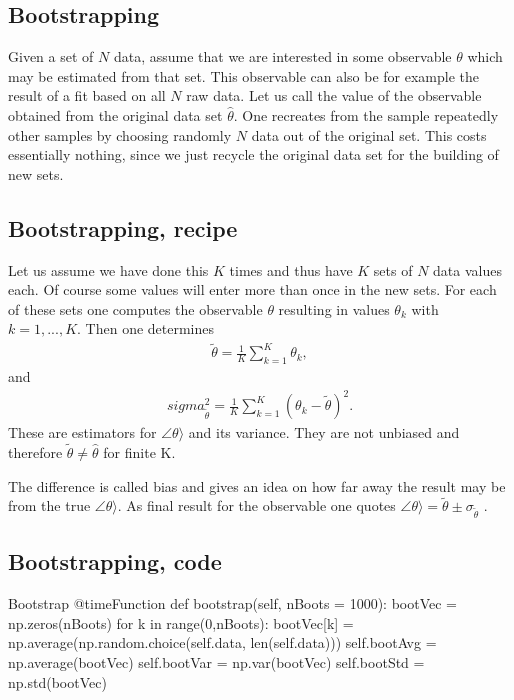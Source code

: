 \documentclass[letterpaper,10pt,english]{sphinxmanual}
\begin{document}
\subsection{Bootstrapping}
\label{\detokenize{chapter3:bootstrapping}}
Given a set of \(N\) data, assume that we are interested in some
observable \(\theta\) which may be estimated from that set. This observable can also be for example the result of a fit based on all \(N\) raw data.
Let us call the value of the observable obtained from the original
data set \(\hat{\theta}\). One recreates from the sample repeatedly
other samples by choosing randomly \(N\) data out of the original set.
This costs essentially nothing, since we just recycle the original data set for the building of new sets.




\subsection{Bootstrapping, recipe}
\label{\detokenize{chapter3:bootstrapping-recipe}}
Let us assume we have done this \(K\) times and thus have \(K\) sets of \(N\)
data values each.
Of course some values will enter more than once in the new sets. For each of these sets one computes the observable \(\theta\) resulting in values \(\theta_k\) with \(k = 1,...,K\). Then one determines
\begin{equation*}
\begin{split}
\tilde{\theta} = \frac{1}{K} \sum_{k=1}^K \theta_k,
\end{split}
\end{equation*}
and
\begin{equation*}
\begin{split}
sigma^2_{\tilde{\theta}} = \frac{1}{K} \sum_{k=1}^K \left(\theta_k-\tilde{\theta}\right)^2.
\end{split}
\end{equation*}
These are estimators for \(\angle\theta\rangle\) and its variance. They are not unbiased and therefore
\(\tilde{\theta}\neq\hat{\theta}\)  for finite K.

The difference is called bias and gives an idea on how far away the result may be from
the true \(\angle\theta\rangle\). As final result for the observable one quotes \(\angle\theta\rangle = \tilde{\theta} \pm \sigma_{\tilde{\theta}}\) .




\subsection{Bootstrapping, code}
\label{\detokenize{chapter3:bootstrapping-code}}
\begin{sphinxVerbatim}[commandchars=\\\{\}]
    \PYGZsh{} Bootstrap
        @timeFunction
        def bootstrap(self, nBoots = 1000):
            bootVec = np.zeros(nBoots)
            for k in range(0,nBoots):
                bootVec[k] = np.average(np.random.choice(self.data, len(self.data)))
            self.bootAvg = np.average(bootVec)
            self.bootVar = np.var(bootVec)
            self.bootStd = np.std(bootVec)
\end{sphinxVerbatim}
\end{document}
